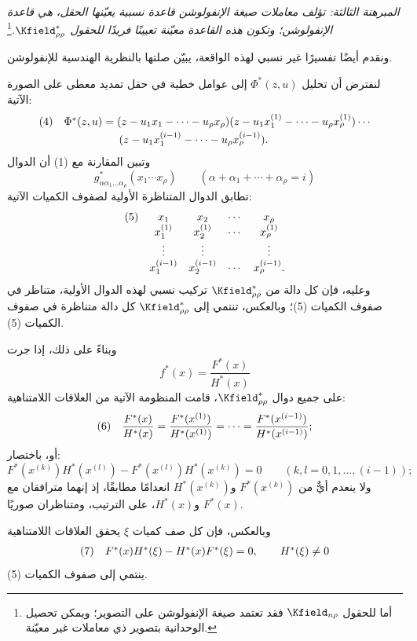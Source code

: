 \documentclass[11pt]{article}
\newcommand{\srcLTR}[1]{\relax\ifmmode\text{\mbox{\babelsublr{\foreignlanguage{english}{#1}}}}\else\babelsublr{\foreignlanguage{english}{#1}}\fi}
\newcommand{\srcfn}[2]{\begingroup\renewcommand{\thefootnote}{\srcLTR{#1}}\footnote{#2}\addtocounter{footnote}{-1}\endgroup}
\begin{document}
\emph{المبرهنة الثالثة: تؤلف معاملات صيغة الإنفولوشن قاعدة نسبية يعيّنها الحقل، هي قاعدة الإنفولوشن؛ وتكون هذه القاعدة معيّنة تعيينًا فريدًا للحقول $\Kfield^*_{\rho\rho}$.}\srcfn{*)}{أما للحقول $\Kfield_{n\rho}$ فقد تعتمد صيغة الإنفولوشن على التصوير؛ ويمكن تحصيل الوحدانية بتصوير ذي معاملات غير معيّنة.}

ونقدم أيضًا تفسيرًا غير نسبي لهذه الواقعة، يبيّن صلتها بالنظرية الهندسية للإنفولوشن.

لنفترض أن تحليل $\Phi^*(z,u)$ إلى عوامل خطية في حقل تمديد معطى على الصورة الآتية:
\[
\begin{array}{@{}l@{\quad}l@{}}
(4)& \Phi^*(z,u)=(z-u_1x_1-\cdots-u_\rho x_\rho)(z-u_1x_1^{(1)}-\cdots-u_\rho x_\rho^{(1)})\cdots\\[0.25em]
& \qquad\qquad\quad (z-u_1x_1^{(i-1)}-\cdots-u_\rho x_\rho^{(i-1)}).
\end{array}
\]
وتبين المقارنة مع (1) أن الدوال
\[
g^*_{\alpha\alpha_1\ldots\alpha_\rho}(x_1\cdots x_\rho)\qquad(\alpha+\alpha_1+\cdots+\alpha_\rho=i)
\]
تطابق الدوال المتناظرة الأولية لصفوف الكميات الآتية:
\[
\begin{array}{@{}l@{\quad}cccc@{}}
(5)&x_1&x_2&\cdots&x_\rho\\
&x_1^{(1)}&x_2^{(1)}&\cdots&x_\rho^{(1)}\\
&\vdots&\vdots&&\vdots\\
&x_1^{(i-1)}&x_2^{(i-1)}&\cdots&x_\rho^{(i-1)}.
\end{array}
\]
وعليه، فإن كل دالة من $\Kfield^*_{\rho\rho}$ تركيب نسبي لهذه الدوال الأولية، متناظر في صفوف الكميات (5)؛ وبالعكس، تنتمي إلى $\Kfield^*_{\rho\rho}$ كل دالة متناظرة في صفوف الكميات (5).

وبناءً على ذلك، إذا جرت
\[
f^*(x)=\frac{F^*(x)}{H^*(x)}
\]
على جميع دوال $\Kfield^*_{\rho\rho}$، قامت المنظومة الآتية من العلاقات اللامتناهية:
\[
\begin{array}{@{}l@{\quad}c@{}}
(6)&\displaystyle \frac{F^*(x)}{H^*(x)}=\frac{F^*(x^{(1)})}{H^*(x^{(1)})}=\cdots=\frac{F^*(x^{(i-1)})}{H^*(x^{(i-1)})};
\end{array}
\]
أو، باختصار:
\[
F^*(x^{(k)})H^*(x^{(l)})-F^*(x^{(l)})H^*(x^{(k)})=0\qquad(k,l=0,1,\ldots,(i-1));
\]
ولا ينعدم أيٌّ من $F^*(x^{(k)})$ و$H^*(x^{(k)})$ انعدامًا مطابقًا، إذ إنهما مترافقان مع $F^*(x)$ و$H^*(x)$، على الترتيب، ومتناظران صوريًا.

وبالعكس، فإن كل صف كميات $\xi$ يحقق العلاقات اللامتناهية
\[
\begin{array}{@{}l@{\quad}c@{}}
(7)&F^*(x)H^*(\xi)-H^*(x)F^*(\xi)=0,\qquad H^*(\xi)\ne0
\end{array}
\]
ينتمي إلى صفوف الكميات (5).
\end{document}
